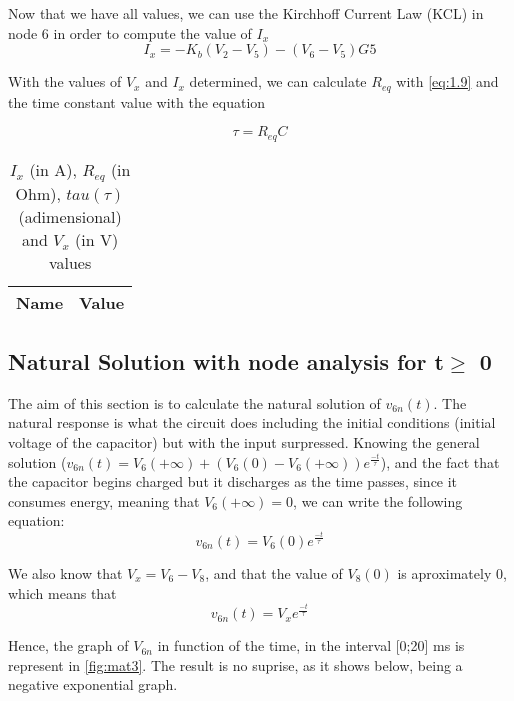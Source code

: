 Now that we have all values, we can use the Kirchhoff Current Law (KCL) in node 6 in order to compute the value of $I_x$
\begin{equation}
I_x = -K_b (V_2 - V_5) - (V_6 - V_5) G5
\label{eq:1.10}
\end{equation}

With the values of $V_x$ and $I_x$ determined, we can calculate $R_{eq}$ with \ref{eq:1.9} and the time constant value with the equation

\begin{equation}
\tau = R_{eq} C
\label{eq:1.11}
\end{equation}

\begin{table}[H]
  \centering
  \begin{tabular}{|l|r|}
    \hline    
    {\bf Name} & {\bf Value} \\ \hline
    
  \end{tabular}
  \caption{$I_x$ (in A), $R_{eq}$ (in Ohm), $tau(\tau)$ (adimensional) and $V_x$ (in V) values}
  \label{tab:mat2b}
\end{table}

\subsection{Natural Solution with node analysis for t$\geq$ 0}
The aim of this section is to calculate the natural solution of $v_{6n} (t)$. The natural response is what the circuit does including the initial conditions (initial voltage of the capacitor) but with the input surpressed.
Knowing the general solution ($v_{6n} (t) = V_6(+\infty) + (V_6(0) - V_6(+\infty))e^{\frac{-t}{\tau}}$), and the fact that the capacitor begins charged but it discharges as the time passes, since it consumes energy, meaning that $V_6(+\infty) = 0$, we can write the following equation:
\begin{equation}
v_{6n} (t) = V_6(0) e^{\frac{-t}{\tau}}
\label{eq:1.12}
\end{equation}

We also know that $V_x = V_6 - V_8$, and that the value of $V_8 (0)$ is aproximately 0, which means that
\begin{equation}
v_{6n} (t) = V_x e^{\frac{-t}{\tau}}
\label{eq:1.13}
\end{equation}

Hence, the graph of $V_{6n}$ in function of the time, in the interval [0;20] ms is represent in \ref{fig:mat3}. The result is no suprise, as it shows below, being a negative exponential graph.

